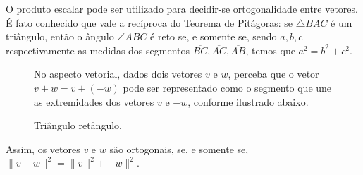 O produto escalar pode ser utilizado para decidir-se ortogonalidade entre vetores.
É fato conhecido que vale a recíproca do Teorema de Pitágoras: se $\triangle BAC$ é um triângulo, então o ângulo $\angle ABC$ é reto se, e somente se, sendo $a, b, c$ respectivamente as medidas dos segmentos $\overline{BC}, \overline{AC}, \overline{AB}$, temos que $a^2=b^2+c^2$.

\begin{figure}[ht]
    \centering
    \caption{Triângulo retângulo.}

    No aspecto vetorial, dados dois vetores $v$ e $w$, perceba que o vetor $v+w=v+(-w)$ pode ser representado como o segmento que une as extremidades dos vetores $v$ e $-w$, conforme ilustrado abaixo.

\end{figure}

Assim, os vetores $v$ e $w$ são ortogonais, se, e somente se, $\|v-w\|^2=\|v\|^2+\|w\|^2$.

